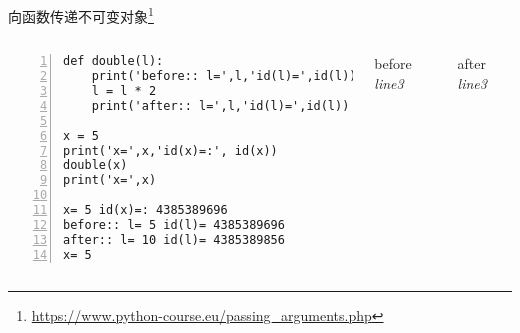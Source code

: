 \documentclass{beamer}
\begin{document}
\begin{frame}[fragile]{向函数传递不可变对象\footnote{\url{https://www.python-course.eu/passing_arguments.php}}}
\begin{columns}
\begin{Verbatim}[numbers=left,frame=single,rulecolor=\color{red}]
def double(l):
    print('before:: l=',l,'id(l)=',id(l))
    l = l * 2
    print('after:: l=',l,'id(l)=',id(l))

x = 5
print('x=',x,'id(x)=:', id(x))
double(x)
print('x=',x)

x= 5 id(x)=: 4385389696
before:: l= 5 id(l)= 4385389696
after:: l= 10 id(l)= 4385389856
x= 5
\end{Verbatim}
\begin{block}{before \textit{line3}}
\end{block}
\begin{block}{after \textit{line3}}
\end{block}

\end{columns}
\end{frame}
\end{document}
